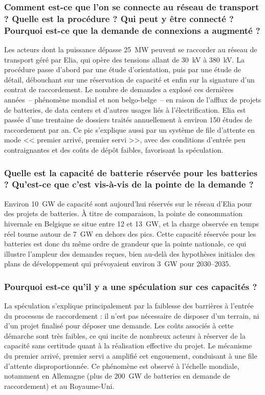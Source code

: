 \subsubsection{Comment est-ce que l'on se connecte au réseau de transport ? Quelle est la procédure ? Qui peut y être connecté ? Pourquoi est-ce que la demande de connexions a augmenté ?}

Les acteurs dont la puissance dépasse 25~MW peuvent se raccorder au réseau de transport géré par Elia, qui opère des tensions allant de 30~kV à 380~kV. La procédure passe d'abord par une étude d'orientation, puis par une étude de détail, débouchant sur une réservation de capacité et enfin sur la signature d'un contrat de raccordement. Le nombre de demandes a explosé ces dernières années~-- phénomène mondial et non belgo-belge~-- en raison de l'afflux de projets de batteries, de data centers et d'autres usages liés à l'électrification. Elia est passée d'une trentaine de dossiers traités annuellement à environ 150 études de raccordement par an. Ce pic s'explique aussi par un système de file d'attente en mode << premier arrivé, premier servi >>, avec des conditions d'entrée peu contraignantes et des coûts de dépôt faibles, favorisant la spéculation.

\subsubsection{Quelle est la capacité de batterie réservée pour les batteries ? Qu'est-ce que c'est vis-à-vis de la pointe de la demande ?}

Environ 10~GW de capacité sont aujourd'hui réservés sur le réseau d'Elia pour des projets de batteries. À titre de comparaison, la pointe de consommation hivernale en Belgique se situe entre 12 et 13~GW, et la charge observée en temps réel tourne autour de 7~GW en dehors des pics. Cette capacité réservée pour les batteries est donc du même ordre de grandeur que la pointe nationale, ce qui illustre l'ampleur des demandes reçues, bien au-delà des hypothèses initiales des plans de développement qui prévoyaient environ 3~GW pour 2030--2035.

\subsubsection{Pourquoi est-ce qu'il y a une spéculation sur ces capacités ?}

La spéculation s'explique principalement par la faiblesse des barrières à l'entrée du processus de raccordement : il n'est pas nécessaire de disposer d'un terrain, ni d'un projet finalisé pour déposer une demande. Les coûts associés à cette démarche sont très faibles, ce qui incite de nombreux acteurs à réserver de la capacité sans certitude quant à la réalisation effective du projet. Le mécanisme du premier arrivé, premier servi a amplifié cet engouement, conduisant à une file d'attente disproportionnée. Ce phénomène est observé à l'échelle mondiale, notamment en Allemagne (plus de 200~GW de batteries en demande de raccordement) et au Royaume-Uni.

